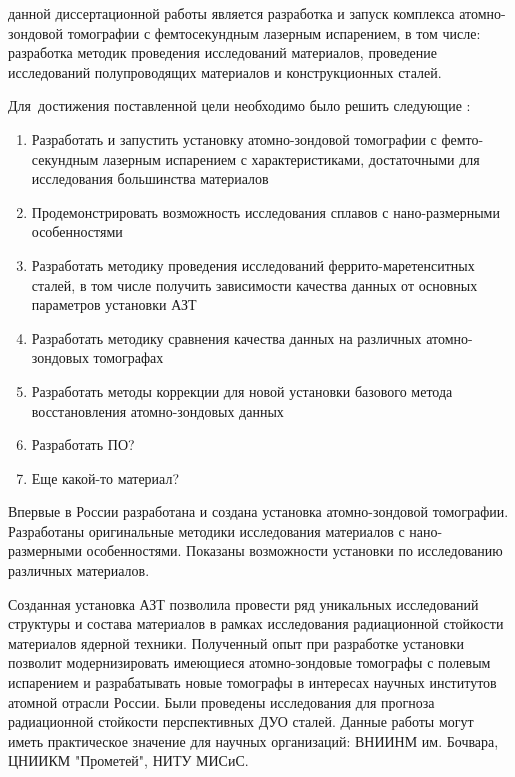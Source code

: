 
{\aim} данной диссертационной работы является разработка и запуск комплекса атомно-зондовой томографии с фемтосекундным лазерным испарением, в том числе: разработка методик проведения исследований материалов, проведение исследований полупроводящих материалов и конструкционных сталей.%

Для~достижения поставленной цели необходимо было решить следующие {\tasks}:
\begin{enumerate}[beginpenalty=10000] %
  \item Разработать и запустить установку атомно-зондовой томографии с фемто-секундным лазерным испарением с характеристиками, достаточными для исследования большинства материалов
  \item Продемонстрировать возможность исследования сплавов с нано-размерными особенностями
  \item Разработать методику проведения исследований феррито-маретенситных сталей, в том числе получить зависимости качества данных от основных параметров установки АЗТ
  \item Разработать методику сравнения качества данных на различных атомно-зондовых томографах
  \item Разработать методы коррекции для новой установки базового метода восстановления атомно-зондовых данных
  \item Разработать ПО?
  \item Еще какой-то материал?
\end{enumerate}


{\novelty}
Впервые в России разработана и создана установка атомно-зондовой томографии. Разработаны оригинальные методики исследования материалов с нано-размерными особенностями. Показаны возможности установки по исследованию различных материалов.

{\influence} Созданная установка АЗТ позволила провести ряд уникальных исследований структуры и состава материалов в рамках исследования радиационной стойкости материалов ядерной техники. Полученный опыт при разработке установки позволит модернизировать имеющиеся атомно-зондовые томографы с полевым испарением и разрабатывать новые томографы в интересах научных институтов атомной отрасли России. Были проведены исследования для прогноза радиационной стойкости перспективных ДУО сталей. Данные работы могут иметь практическое значение для научных организаций: ВНИИНМ им. Бочвара, ЦНИИКМ "Прометей", НИТУ МИСиС.

